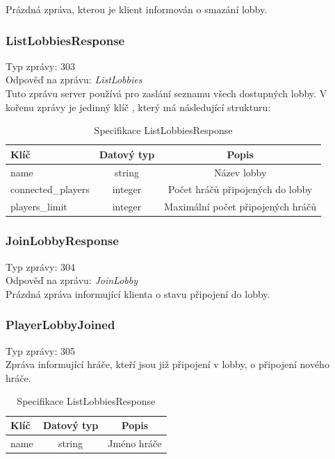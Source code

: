 \documentclass[12pt, a4paper]{article}
\begin{document}
    Prázdná zpráva, kterou je klient informován o smazání lobby.

    \subsubsection*{ListLobbiesResponse}
    Typ zprávy: 303\\
    Odpověď na zprávu: \textit{ListLobbies}\\

    Tuto zprávu server používá pro zaslání seznamu všech dostupných lobby.
    V kořenu zprávy je jedinný klíč , který má následující strukturu:

    \begin{table}[H]
        \centering
        \begin{tabular}{|l|c|c|}
            \hline
            Klíč & Datový typ & Popis\\
            \hline
            \hline
            name & string & Název lobby\\
            \hline
            connected\_players & integer & Počet hráčů připojených do lobby\\
            \hline
            players\_limit & integer & Maximální počet připojených hráčů\\
            \hline
        \end{tabular}
        \caption{Specifikace ListLobbiesResponse}
    \end{table}

    \subsubsection*{JoinLobbyResponse}
    Typ zprávy: 304\\
    Odpověď na zprávu: \textit{JoinLobby}\\

    Prázdná zpráva informující klienta o stavu připojení do lobby.

    \subsubsection*{PlayerLobbyJoined}
    Typ zprávy: 305\\

    Zpráva informující hráče, kteří jsou již připojení v lobby, o připojení nového hráče.

    \begin{table}[H]
        \centering
        \begin{tabular}{|l|c|c|}
            \hline
            Klíč & Datový typ & Popis\\
            \hline
            \hline
            name & string & Jméno hráče\\
            \hline
        \end{tabular}
        \caption{Specifikace ListLobbiesResponse}
    \end{table}
\end{document}

